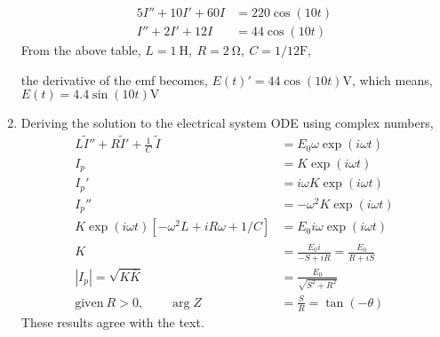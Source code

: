 \begin{enumerate}
          \begin{align}
              5I'' + 10I' + 60I & = 220 \cos(10t) \\
              I'' + 2I' + 12I   & = 44 \cos(10t)
          \end{align}
          From the above table, $ L = \SI{1}{\henry},\  R = \SI{2}{\ohm},\ C = 1/12 \unit{\farad}$, \par
          the derivative of the emf becomes, $ E(t)' = 44 \cos(10t) \unit{\volt} $, which means,
          $ E(t) =  4.4\sin(10t) \unit{\volt}$

    \item Deriving the solution to the electrical system ODE using complex numbers,
          \begin{align}
              L\tilde{I}'' +  R \tilde{I}' + \frac{1}{C}\ \tilde{I}                    & = E_{0}\omega \exp(i\omega t)                   \\
              I_{p}                                                                    & = K\exp(i\omega t)                              \\
              I_{p}'                                                                   & = i\omega K\exp(i\omega t)                      \\
              I_{p}''                                                                  & = -\omega^{2}K\exp(i\omega t)                   \\
              K\exp(i\omega t) [-\omega^{2}L + iR\omega + 1/C]                         & = E_{0}i\omega \exp(i\omega t)                  \\
              K                                                                        & = \frac{E_{0}i}{-S + iR} = \frac{E_{0}}{R + iS} \\
              |I_{p}|                                               = \sqrt{K \bar{K}} & = \frac{E_{0}}{\sqrt{S^{2} + R^{2}}}            \\
              \text{given}\ R > 0, \qquad \arg Z                                       & = \frac{S}{R} = \tan(-\theta)
          \end{align}
          These results agree with the text.
\end{enumerate}